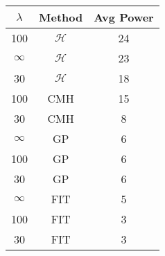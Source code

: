 \centering \begin{tabular}{c|c|c}
$\lambda$	&Method	&Avg Power\\\hline
100	&$\mathcal{H}$	&24\\
$\infty$	&$\mathcal{H}$	&23\\
30	&$\mathcal{H}$	&18\\
100	&CMH	&15\\
30	&CMH	&8\\
$\infty$	&GP	&6\\
100	&GP	&6\\
30	&GP	&6\\
$\infty$	&FIT	&5\\
100	&FIT	&3\\
30	&FIT	&3\\
\end{tabular}
